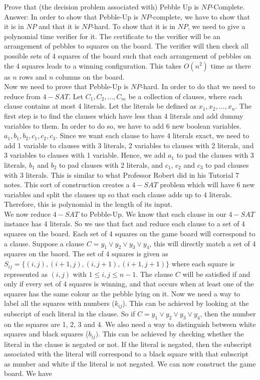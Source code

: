 \documentclass{csc_assignment}
\begin{document}
\begin{description}
  Prove that (the decision problem associated with) Pebble Up is $NP$-Complete.\\
  
  Answer: In order to show that Pebble-Up is $NP$-complete, we have to show that it is in $NP$ and that it is $NP$-hard. To show that it is in $NP$, we need to give a polynomial time verifier for it. The certificate to the verifier will be an arrangement of pebbles to squares on the board. The verifier will then check all possible sets of 4 squares of the board such that each arrangement of pebbles on the 4 squares leads to a winning configuration. This takes $O(n^{2})$ time as there as $n$ rows and $n$ columns on the board. \\ Now we need to prove that Pebble-Up is $NP$-hard. In order to do that we need to reduce from $4-SAT$. Let $C_{1}, C_{2}, \ldots , C_{m}$ be a collection of clauses, where each clause contains at most 4 literals. Let the literals be defined as $x_{1}, x_{2}, \ldots , x_{n}$. The first step is to find the clauses which have less than 4 literals and add dummy variables to them. In order to do so, we have to add 6 new boolean variables. $a_{1}, b_{1}, b_{2}, c_{1}, c_{2}, c_{3}$. Since we want each clause to have 4 literals exact, we need to add 1 variable to clauses with 3 literals, 2 variables to clauses with 2 literals, and 3 variables to clauses with 1 variable. Hence, we add $a_{1}$ to pad the clauses with 3 literals, $b_{1}$ and $b_{2}$ to pad clauses with 2 literals, and $c_{1}$, $c_{2}$ and $c_{3}$ to pad clauses with 3 literals. This is similar to what Professor Robert did in his Tutorial 7 notes. This sort of construction creates a $4-SAT$ problem which will have 6 new variables and split the clauses up so that each clause adds up to 4 literals. Therefore, this is polynomial in the length of its input. \\ We now reduce $4-SAT$ to Pebble-Up. We know that each clause in our $4-SAT$ instance has 4 literals. So we use that fact and reduce each clause to a set of 4 squares on the board. Each set of 4 squares on the game board will correspond to a clause. Suppose a clause $C = y_{1} \vee y_{2} \vee y_{3} \vee y_{4}$, this will directly match a set of 4 squares on the baord. The set of 4 squares is given as $S_{ij} = \{(i, j), (i+1, j), (i, j+1), (i+1, j+1)\}$ where each square is represented as $(i, j)$ with $1 \leq i, j \leq n - 1$. The clause $C$ will be satisfied if and only if every set of 4 squares is winning, and that occurs when at least one of the squares has the same colour as the pebble lying on it. Now we need a way to label all the squares with numbers ($k_{ij}$). This can be achieved by looking at the subscript of each literal in the clause. So if $C = y_{1} \vee y_{2} \vee y_{3} \vee y_{4}$, then the number on the squares are 1, 2, 3 and 4. We also need a way to distinguish between white squares and black squares ($b_{ij})$. This can be achieved by checking whether the literal in the clause is negated or not. If the literal is negated, then the subscript associated with the literal will correspond to a black square with that subscript as number and white if the literal is not negated. We can now construct the game board. We have 
\end{description}
\end{document}
